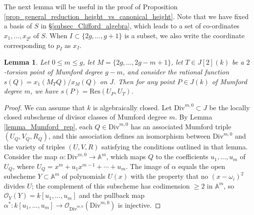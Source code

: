 \documentclass{article} %
\newtheorem{lemma}[proposition]{Lemma}
\numberwithin{equation}{section}
\newcommand{\A}{\mathbb{A}}
\newcommand{\cO}{\mathcal{O}}
\begin{document}
The next lemma will be useful in the proof of Proposition \ref{prop_general_reduction_height_vs_canonical_height}.
Note that we have fixed a basis of $S$ in \S\ref{subsec_Clifford_algebra}, which leads to a set of co-ordinates $x_1, \dots, x_{2^g}$ of $S$.
When $I\subset\{2g, \dots, g+1\}$ is a subset, we also write the coordinate corresponding to $p_I$ as $x_I$. 
\begin{lemma}\label{lemma_coordinate_resultant}
Let $0 \leq m \leq g$, let $M = \{2g, \dots, 2g-m+1\}$, let $T \in J[2](k)$ be a $2$-torsion point of Mumford degree $g-m$, and consider the rational function $s(Q) = x_1(M_T Q)/x_M(Q)$ on $J$. Then for any point $P \in J(k)$ of Mumford degree $m$, we have $s(P) = \mathrm{Res}(U_P, U_T)$. 
\end{lemma}
\begin{proof}
We can assume that $k$ is algebraically closed. Let $\mathrm{Div}^{m,0}\subset J$ be the locally closed subscheme of divisor classes of Mumford degree $m$. 
By Lemma \ref{lemma_Mumford_rep}, each $Q\in \mathrm{Div}^{m,0}$ has an associated Mumford triple $(U_Q, V_Q, R_Q)$, and this association defines an isomorphism between $\mathrm{Div}^{m,0}$ and the variety of triples $(U,V,R)$ satisfying the conditions outlined in that lemma.
Consider the map $\alpha\colon \mathrm{Div}^{m,0}\rightarrow \A^m$, which maps $Q$ to the coefficients $u_1, \dots, u_m$ of $U_Q$, where $U_Q = x^m + u_1x^{m-1} + \cdots + u_m$.
The image of $\alpha$ equals the open subscheme $Y\subset \A^m$ of polynomials $U(x)$ with the property that no $(x-\omega_i)^2$ divides $U$; the complement of this subscheme has codimension $\geq 2$ in $\A^m$, so $\mathcal{O}_Y(Y) = k[u_1, \dots, u_m]$ and the pullback map $\alpha^*\colon k[u_1, \dots, u_m]\rightarrow \cO_{\mathrm{Div}^{m,0}}(\mathrm{Div}^{m,0})$ is injective.


\end{proof}
\end{document}
